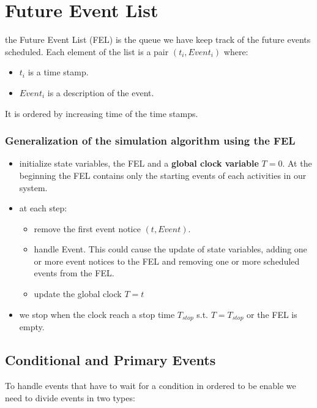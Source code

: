 \section{Future Event List}
the Future Event List (FEL) is the queue we have keep track of the future events scheduled. Each element of the list is a pair $(t_{i}, Event_{i})$ where:
\begin{itemize}
    \item $t_{i}$ is a time stamp.
    \item $Event_{i}$ is a description of the event.
\end{itemize}

It is ordered by increasing time of the time stamps.\par


\subsubsection{Generalization of the simulation algorithm using the FEL}
\begin{itemize}
    \item initialize state variables, the FEL and a \textbf{global clock variable} $T = 0$. At the beginning the FEL contains only the starting events of each activities in our system.
    \item at each step:
        \begin{itemize}
            \item remove the first event notice $(t, Event)$.
            \item handle Event. This could cause the update of state variables, adding one or more event notices to the FEL and removing one or more scheduled events from the FEL.
            \item update the global clock $T = t$
        \end{itemize}

    \item we stop when the clock reach a stop time $T_{stop}$ s.t. $T = T_{stop}$ or the FEL is empty. 
\end{itemize}

\subsection{Conditional and Primary Events}
To handle events that have to wait for a condition in ordered to be enable we need to divide events in two types:

